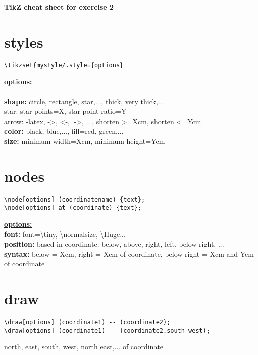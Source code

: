 \documentclass[a4paper,12pt,toc=bibliography,twoside,numbers=noenddot]{scrbook}
\begin{document}
\begin{center} 
	\textbf{\Large TikZ cheat sheet for exercise 2}\\
	\vspace{1cm}
	
\end{center}

		
\section*{styles}
\begin{lstlisting}
\tikzset{mystyle/.style={options}
\end{lstlisting}
\underline{\textbf{options:}}\\ \\
\textbf{shape:} circle, rectangle, star,..., thick, very thick,...\\
\phantom{x} star: star points=X, star point ratio=Y\\
\phantom{x} arrow: -latex, ->, <-, |->, ..., shorten >=Xcm, shorten <=Ycm\\
\textbf{color:} black, blue,..., fill=red, green,...\\
\textbf{size:} minimum width=Xcm, minimum height=Ycm
\vspace{1cm}

\section*{nodes}
\begin{lstlisting}
\node[options] (coordinatename) {text};
\node[options] at (coordinate) {text};
\end{lstlisting}
\underline{\textbf{options:}}\\
\textbf{font:} font={\tiny \textbackslash tiny}, {\normalsize \textbackslash normalsize}, {\Huge \textbackslash Huge}...\\
\textbf{position:} based in coordinate: below, above, right, left, below right, ...\\
\textbf{syntax:} below = Xcm, right = Xcm of coordinate, below right = Xcm and Ycm of coordinate
\vspace{1cm}

\section*{draw}
\begin{lstlisting}
\draw[options] (coordinate1) -- (coordinate2);
\draw[options] (coordinate1) -- (coordinate2.south west);
\end{lstlisting}
north, east, south, west, north east,... of coordinate
\end{document}
